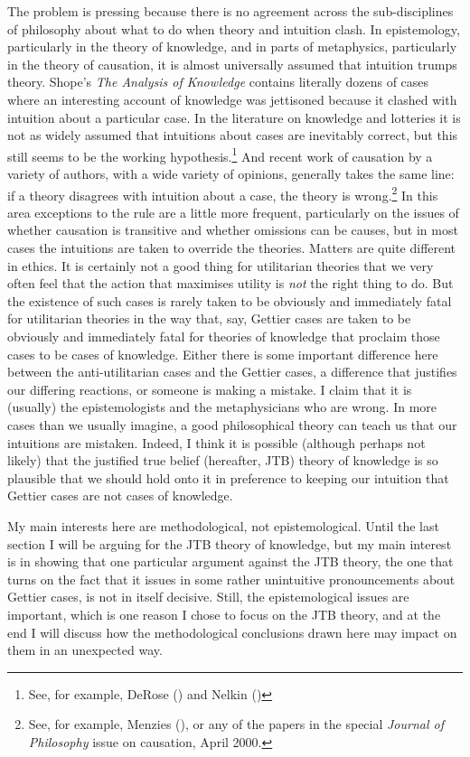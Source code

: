 \documentclass[
  10pt,
  letterpaper,
  DIV=11,
  numbers=noendperiod,
  twoside]{scrartcl}
\begin{document}
The problem is pressing because there is no agreement across the
sub-disciplines of philosophy about what to do when theory and intuition
clash. In epistemology, particularly in the theory of knowledge, and in
parts of metaphysics, particularly in the theory of causation, it is
almost universally assumed that intuition trumps theory. Shope's
\emph{The Analysis of Knowledge} contains literally dozens of cases
where an interesting account of knowledge was jettisoned because it
clashed with intuition about a particular case. In the literature on
knowledge and lotteries it is not as widely assumed that intuitions
about cases are inevitably correct, but this still seems to be the
working hypothesis.\footnote{See, for example, DeRose
  () and Nelkin
  ()} And recent work of causation by a
variety of authors, with a wide variety of opinions, generally takes the
same line: if a theory disagrees with intuition about a case, the theory
is wrong.\footnote{See, for example, Menzies
  (), or any of the papers in the
  special \emph{Journal of Philosophy} issue on causation, April 2000.}
In this area exceptions to the rule are a little more frequent,
particularly on the issues of whether causation is transitive and
whether omissions can be causes, but in most cases the intuitions are
taken to override the theories. Matters are quite different in ethics.
It is certainly not a good thing for utilitarian theories that we very
often feel that the action that maximises utility is \emph{not} the
right thing to do. But the existence of such cases is rarely taken to be
obviously and immediately fatal for utilitarian theories in the way
that, say, Gettier cases are taken to be obviously and immediately fatal
for theories of knowledge that proclaim those cases to be cases of
knowledge. Either there is some important difference here between the
anti-utilitarian cases and the Gettier cases, a difference that
justifies our differing reactions, or someone is making a mistake. I
claim that it is (usually) the epistemologists and the metaphysicians
who are wrong. In more cases than we usually imagine, a good
philosophical theory can teach us that our intuitions are mistaken.
Indeed, I think it is possible (although perhaps not likely) that the
justified true belief (hereafter, JTB) theory of knowledge is so
plausible that we should hold onto it in preference to keeping our
intuition that Gettier cases are not cases of knowledge.

My main interests here are methodological, not epistemological. Until
the last section I will be arguing for the JTB theory of knowledge, but
my main interest is in showing that one particular argument against the
JTB theory, the one that turns on the fact that it issues in some rather
unintuitive pronouncements about Gettier cases, is not in itself
decisive. Still, the epistemological issues are important, which is one
reason I chose to focus on the JTB theory, and at the end I will discuss
how the methodological conclusions drawn here may impact on them in an
unexpected way.
\end{document}
